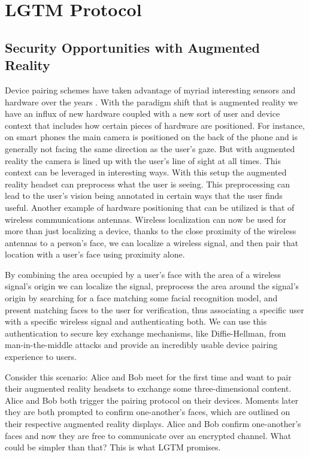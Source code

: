 \documentclass[12pt]{report}
\begin{document}
\chapter{LGTM Protocol}
\section{Security Opportunities with Augmented Reality}
Device pairing schemes have taken advantage of myriad interesting sensors and hardware over the years \cite{PlayfulPairingGallego2011,BedaSoriente2007,ShakeWellBeforeUseMayrhofer2009,SeeingIsBelievingMcCune2005,TalkingToStrangersSmetters2002,LoudAndClearGoodrich2006,HapadepSoriente2008,VisualChannelPairingSaxena2006}. With the paradigm shift that is augmented reality we have an influx of new hardware coupled with a new sort of user and device context that includes how certain pieces of hardware are positioned. For instance, on smart phones the main camera is positioned on the back of the phone and is generally not facing the same direction as the user's gaze. But with augmented reality the camera is lined up with the user's line of sight at all times. This context can be leveraged in interesting ways. With this setup the augmented reality headset can preprocess what the user is seeing. This preprocessing can lead to the user's vision being annotated in certain ways that the user finds useful. Another example of hardware positioning that can be utilized is that of wireless communications antennas. Wireless localization can now be used for more than just localizing a device, thanks to the close proximity of the wireless antennas to a person's face, we can localize a wireless signal, and then pair that location with a user's face using proximity alone. \par

By combining the area occupied by a user's face with the area of a wireless signal's origin we can localize the signal, preprocess the area around the signal's origin by searching for a face matching some facial recognition model, and present matching faces to the user for verification, thus associating a specific user with a specific wireless signal and authenticating both. We can use this authentication to secure key exchange mechanisms, like Diffie-Hellman, from man-in-the-middle attacks and provide an incredibly usable device pairing experience to users. \par

Consider this scenario: Alice and Bob meet for the first time and want to pair their augmented reality headsets to exchange some three-dimensional content. Alice and Bob both trigger the pairing protocol on their devices. Moments later they are both prompted to confirm one-another's faces, which are outlined on their respective augmented reality displays. Alice and Bob confirm one-another's faces and now they are free to communicate over an encrypted channel. What could be simpler than that? This is what LGTM promises. \par
\end{document}

